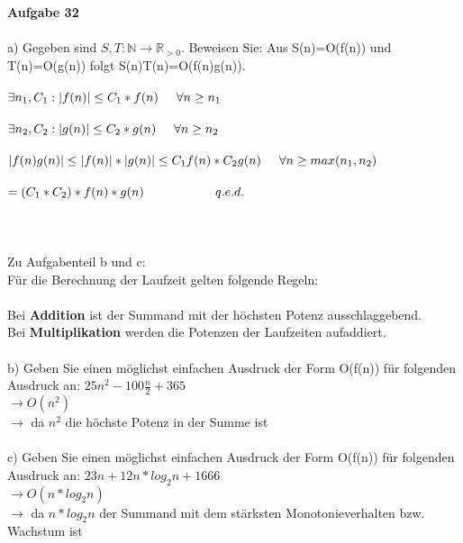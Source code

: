 \documentclass{article}
\begin{document}
\large{\hspace*{-5mm}\textbf{Aufgabe 32}}
\\\\a) Gegeben sind $S, T: \mathbb{N} \rightarrow \mathbb{R}_{>0}$. Beweisen Sie: Aus S(n)=O(f(n)) und T(n)=O(g(n)) folgt S(n)T(n)=O(f(n)g(n)).
\\\\$\exists n_{1},C_{1}: \vert f(n)\vert \le C_{1}*f(n) \hspace*{5mm}\forall n \ge n_{1}$
\\\\$\exists n_{2},C_{2}: \vert g(n)\vert \le C_{2}*g(n) \hspace*{5mm}\forall n \ge n_{2}$
\\\\$\vert f(n)g(n)\vert \le \vert f(n)\vert * \vert g(n) \vert \le C_{1}f(n)*C_{2}g(n) \hspace*{5mm} \forall n \ge max(n_{1},n_{2})$
\\\\$= (C_{1}*C_{2})*f(n)*g(n)\hspace*{20mm}q.e.d.$
\\\\\\\\Zu Aufgabenteil b und c:
\\Für die Berechnung der Laufzeit gelten folgende Regeln: 
\\\\Bei \textbf{Addition} ist der Summand mit der höchsten Potenz ausschlaggebend. 
\\Bei \textbf{Multiplikation} werden die Potenzen der Laufzeiten aufaddiert.
\\\\b) Geben Sie einen möglichst einfachen Ausdruck der Form O(f(n)) für folgenden Ausdruck an: $25n^2-100\frac{n}{2}+365$
\\$\rightarrow O(n^2)$
\\$\rightarrow$ da $n^2$ die höchste Potenz in der Summe ist
\\\\c) Geben Sie einen möglichst einfachen Ausdruck der Form O(f(n)) für folgenden Ausdruck an: $23n + 12n*log_{2} n +1666$
\\$\rightarrow O(n*log_{2}n)$
\\$\rightarrow$ da $n*log_{2}n$ der Summand mit dem stärksten Monotonieverhalten bzw. Wachstum ist
\end{document}

